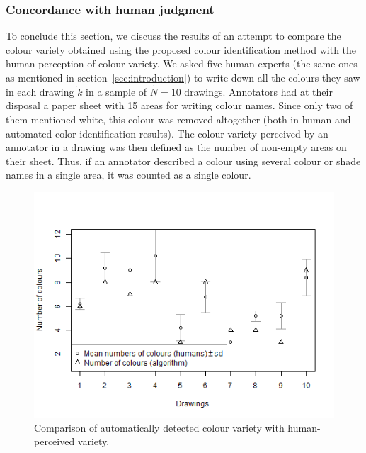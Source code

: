 \documentclass[11pt,a4paper]{article}
\begin{document}


\subsubsection{Concordance with human judgment} \label{sec:results_variety_concordance}

To conclude this section, we discuss the results of an attempt to compare the colour variety obtained using the proposed colour identification method with the human perception of colour variety. We asked five human experts (the same ones as mentioned in section~\ref{sec:introduction}) to write down all the colours they saw in each drawing $\tilde{k}$ in a sample of $\tilde{N} = 10$ drawings. Annotators had at their disposal a paper sheet with 15 areas for writing colour names. Since only two of them mentioned white, this colour was removed altogether (both in human and automated color identification results). The colour variety perceived by an annotator in a drawing was then defined as the number of non-empty areas on their sheet. Thus, if an annotator described a colour using several colour or shade names in a single area, it was counted as a single colour.

\begin{figure}[h!]
	\centering
	\includegraphics[width=\linewidth]{figures/comp_nb_colours_sd.png}
	\caption{Comparison of automatically detected colour variety with human-perceived variety.}
	\label{fig:compnbcolourssd}
\end{figure}
\end{document}
